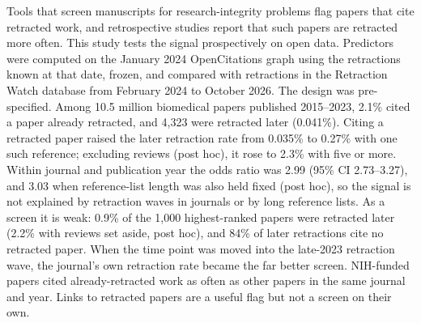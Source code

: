 Tools that screen manuscripts for research-integrity problems flag papers that cite retracted work, and retrospective
studies report that such papers are retracted more often. This study tests the signal prospectively on open data.
Predictors were computed on the January 2024 OpenCitations graph using the retractions known at that date, frozen, and
compared with retractions in the Retraction Watch database from February 2024 to October 2026. The design was
pre-specified. Among 10.5 million biomedical papers published 2015--2023, 2.1\% cited a paper already retracted, and
4,323 were retracted later (0.041\%). Citing a retracted paper raised the later retraction rate from 0.035\% to 0.27\%
with one such reference; excluding reviews (post hoc), it rose to 2.3\% with five or more. Within journal and publication year the odds ratio was 2.99 (95\%
CI 2.73--3.27), and 3.03 when reference-list length was also held fixed (post hoc), so the signal is not explained by
retraction waves in journals or by long reference lists. As a screen it is weak: 0.9\% of the
1,000 highest-ranked papers were retracted later (2.2\% with reviews set aside, post hoc), and 84\% of later retractions cite
no retracted paper. When the time
point was moved into the late-2023 retraction wave, the journal's own retraction rate became the far better screen.
NIH-funded papers cited already-retracted work as often as other papers in the same journal and year. Links to
retracted papers are a useful flag but not a screen on their own.
